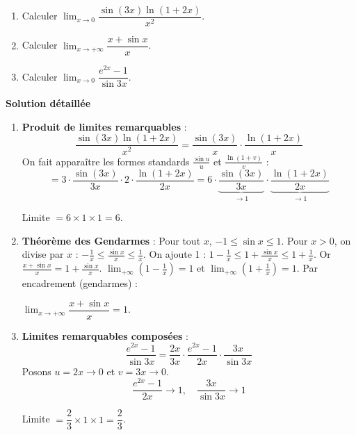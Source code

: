 \documentclass[11pt]{article}
\begin{document}
\begin{exoresolu}
    \begin{enumerate}
        \item Calculer $\lim_{x\to 0} \dfrac{\sin(3x) \ln(1+2x)}{x^2}$.
        \item Calculer $\lim_{x\to +\infty} \dfrac{x + \sin x}{x}$.
        \item Calculer $\lim_{x\to 0} \dfrac{e^{2x} - 1}{\sin 3x}$.
    \end{enumerate}
    \tcblower
    \textbf{Solution détaillée}
    \begin{enumerate}
        \item \textbf{Produit de limites remarquables} :
              \[ \frac{\sin(3x) \ln(1+2x)}{x^2} = \frac{\sin(3x)}{x} \cdot \frac{\ln(1+2x)}{x} \]
              On fait apparaître les formes standards $\frac{\sin u}{u}$ et $\frac{\ln(1+v)}{v}$ :
              \[ = 3 \cdot \frac{\sin(3x)}{3x} \cdot 2 \cdot \frac{\ln(1+2x)}{2x} = 6 \cdot \underbrace{\frac{\sin(3x)}{3x}}_{\to 1} \cdot \underbrace{\frac{\ln(1+2x)}{2x}}_{\to 1} \]
              \begin{aretenir}
                  Limite $= 6 \times 1 \times 1 = 6$.
              \end{aretenir}
        \item \textbf{Théorème des Gendarmes} :
              Pour tout $x$, $-1 \le \sin x \le 1$.
              Pour $x > 0$, on divise par $x$ : $-\frac{1}{x} \le \frac{\sin x}{x} \le \frac{1}{x}$.
              On ajoute 1 : $1 - \frac{1}{x} \le 1 + \frac{\sin x}{x} \le 1 + \frac{1}{x}$.
              Or $\frac{x + \sin x}{x} = 1 + \frac{\sin x}{x}$.
              $\lim_{+\infty} (1 - \frac{1}{x}) = 1$ et $\lim_{+\infty} (1 + \frac{1}{x}) = 1$.
              Par encadrement (gendarmes) :
              \begin{aretenir}
                  $\lim_{x\to +\infty} \dfrac{x + \sin x}{x} = 1$.
              \end{aretenir}
        \item \textbf{Limites remarquables composées} :
              \[ \frac{e^{2x} - 1}{\sin 3x} = \frac{2x}{3x} \cdot \frac{e^{2x}-1}{2x} \cdot \frac{3x}{\sin 3x} \]
              Posons $u=2x\to 0$ et $v=3x\to 0$.
              \[ \frac{e^{2x}-1}{2x} \to 1, \quad \frac{3x}{\sin 3x} \to 1 \]
              \begin{aretenir}
                  Limite $= \dfrac{2}{3} \times 1 \times 1 = \dfrac{2}{3}$.
              \end{aretenir}
    \end{enumerate}
\end{exoresolu}
\end{document}
